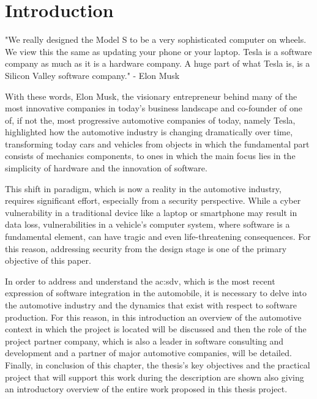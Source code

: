 \hypersetup{
    colorlinks=true,
    linkcolor=blue
}

\chapter{Introduction} \label{ch:introduction}
\begin{center}
  "We really designed the Model S to be a very sophisticated computer on wheels. We view this the same as updating your phone or your laptop. Tesla is a software company as much as it is a hardware company. A huge part of what Tesla is, is a Silicon Valley software company."
  - Elon Musk \cite{ElonMusk}
\end{center}
With these words, Elon Musk, the visionary entrepreneur behind many of the most innovative companies in today's business landscape and co-founder of one of, if not the, most progressive automotive companies of today, namely Tesla, highlighted how the automotive industry is changing dramatically over time, transforming today cars and vehicles from objects in which the fundamental part consists of mechanics components, to ones in which the main focus lies in the simplicity of hardware and the innovation of software.

This shift in paradigm, which is now a reality in the automotive industry, requires significant effort, especially from a security perspective. While a cyber vulnerability in a traditional device like a laptop or smartphone may result in data loss, vulnerabilities in a vehicle's computer system, where software is a fundamental element, can have tragic and even life-threatening consequences. For this reason, addressing security from the design stage is one of the primary objective of this paper.

In order to address and understand the \gls{ac:sdv}, which is the most recent expression of software integration in the automobile, it is necessary to delve into the automotive industry and the dynamics that exist with respect to software production. For this reason, in this introduction an overview of the automotive context in which the project is located will be discussed and then the role of the project partner company, which is also a leader in software consulting and development and a partner of major automotive companies, will be detailed. Finally, in conclusion of this chapter, the thesis's key objectives and the practical project that will support this work during the description are shown also giving an introductory overview of the entire work proposed in this thesis project.

